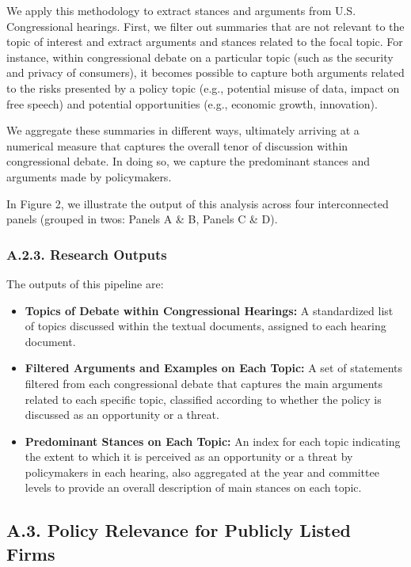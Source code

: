 \documentclass[11pt]{article}
\begin{document}
We apply this methodology to extract stances and arguments from U.S. Congressional hearings. First, we filter out summaries that are not relevant to the topic of interest and extract arguments and stances related to the focal topic. For instance, within congressional debate on a particular topic (such as the security and privacy of consumers), it becomes possible to capture both arguments related to the risks presented by a policy topic (e.g., potential misuse of data, impact on free speech) and potential opportunities (e.g., economic growth, innovation).

We aggregate these summaries in different ways, ultimately arriving at a numerical measure that captures the overall tenor of discussion within congressional debate. In doing so, we capture the predominant stances and arguments made by policymakers.

In Figure 2, we illustrate the output of this analysis across four interconnected panels (grouped in twos: Panels A \& B, Panels C \& D).

\subsubsection*{A.2.3. Research Outputs}

The outputs of this pipeline are:

\begin{itemize}
    \item \textbf{Topics of Debate within Congressional Hearings:} A standardized list of topics discussed within the textual documents, assigned to each hearing document.
    \item \textbf{Filtered Arguments and Examples on Each Topic:} A set of statements filtered from each congressional debate that captures the main arguments related to each specific topic, classified according to whether the policy is discussed as an opportunity or a threat.
    \item \textbf{Predominant Stances on Each Topic:} An index for each topic indicating the extent to which it is perceived as an opportunity or a threat by policymakers in each hearing, also aggregated at the year and committee levels to provide an overall description of main stances on each topic.
\end{itemize}

\subsection*{A.3. Policy Relevance for Publicly Listed Firms}
\end{document}
